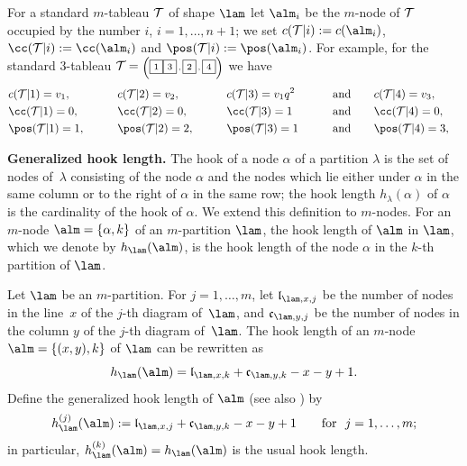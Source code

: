 For a standard $m$-tableau ${\cal{T}}$ of shape $\lam$ let $\alm_i$ be the $m$-node of ${\cal{T}}$ occupied by the number $i$, $i=1,\dots,n+1$;
we set $c({\cal{T}}|i):=c(\alm_i)$, $\cc({\cal{T}}|i):=\cc(\alm_i)$ and $\pos({\cal{T}}|i):=\pos(\alm_i)$.
For example, for the standard $3$-tableau ${\cal{T}}^{^{\phantom{A}}}\!\!\!\!={\textrm{\tiny{$\left(
\fbox{\scriptsize{$1$}}\fbox{\scriptsize{$3$}}\, ,\fbox{\scriptsize{$2$}}\, ,\fbox{\scriptsize{$4$}}\right)$}}}$ we have
\begin{alignat*}{5}
& c({\cal{T}}|1)=v_1 ,\qquad && c({\cal{T}}|2)=v_2 ,\qquad && c({\cal{T}}|3)=v_1q^2\qquad && \text{and}\qquad  c({\cal{T}}|4)=v_3 ,& \\
& \cc({\cal{T}}|1)=0 ,\qquad && \cc({\cal{T}}|2)=0 ,\qquad  && \cc({\cal{T}}|3)=1\qquad && \text{and}\qquad \cc({\cal{T}}|4)=0 ,& \\
& \pos({\cal{T}}|1)=1 ,\qquad && \pos({\cal{T}}|2)=2 ,\qquad && \pos({\cal{T}}|3)=1\qquad &&\text{and}\qquad \pos({\cal{T}}|4)=3 ,&
  \end{alignat*}

{\bf Generalized hook length.} The hook of a node $\alpha$ of a partition $\lambda$ is the set of nodes of~$\lambda$ consisting of the node $\alpha$ and the nodes which lie either under $\alpha$ in the same column or to the right of $\alpha$ in the same row; the hook length $h_{\lambda}(\alpha)$ of $\alpha$ is the cardinality of the hook of $\alpha$.
We extend this def\/inition to $m$-nodes. For an $m$-node $\alm=\{\alpha,k\}$
of an $m$-partition $\lam$, the hook length of $\alm$ in $\lam$, which we denote by $h_{\lam}(\alm)$, is the hook length of the node $\alpha$ in the $k$-th partition of $\lam$.


Let $\lam$ be an $m$-partition. For $j=1,\dots,m$, let $\mathfrak{l}_{\lam,x,j}$ be the number of nodes in the line~$x$ of the $j$-th diagram of~$\lam$, and $\mathfrak{c}_{\lam,y,j}$ be the number of nodes in the column $y$ of the $j$-th diagram of~$\lam$. The hook length of an $m$-node $\alm=\{(x,y),k\}$ of $\lam$
can be rewritten as
\[
h_{\lam}(\alm)=\mathfrak{l}_{\lam,x,k}+\mathfrak{c}_{\lam,y,k}-x-y+1
 .
 \]
Def\/ine the generalized hook length of $\alm$ (see also \cite{CJ}) by
\[
h^{(j)}_{\lam}(\alm):=\mathfrak{l}_{\lam,x,j}+\mathfrak{c}_{\lam,y,k}-x-y+1\qquad  \text{for}\  \ j=1,\dots,m  ;
\]
in particular, $h^{(k)}_{\lam}(\alm)=h_{\lam}(\alm)$ is the usual hook length.



